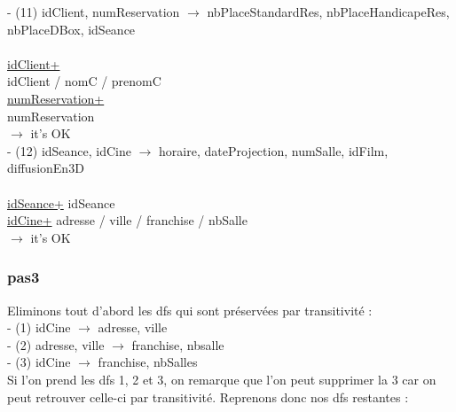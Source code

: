 \documentclass[a4paper,sffamily,12pt]{article}
\begin{document}
				\noindent - (11) idClient, numReservation $\rightarrow$ nbPlaceStandardRes, nbPlaceHandicapeRes, nbPlaceDBox, idSeance \\
					\\
					\underline{idClient+} \\
					idClient / nomC / prenomC \\
					\underline{numReservation+} \\
					numReservation \\	
				$\rightarrow$ it's OK \\					
				
				\noindent - (12) idSeance, idCine $\rightarrow$ horaire, dateProjection, numSalle, idFilm, diffusionEn3D \\												
					\\
					\underline{idSeance+}
					idSeance \\
					\underline{idCine+}
					adresse / ville / franchise / nbSalle \\
				$\rightarrow$ it's OK \\

				\vspace{0.5cm}

			\subsubsection{pas3}		
	
				\vspace{0.5cm}
	
				\noindent Eliminons tout d'abord les dfs qui sont préservées par transitivité : \\
	
					\noindent- (1) idCine $\rightarrow$ adresse, ville \\
					- (2) adresse, ville $\rightarrow$ franchise, nbsalle \\
					- (3) idCine $\rightarrow$ franchise, nbSalles \\
					
					Si l'on prend les dfs 1, 2 et 3, on remarque que l'on peut supprimer la 3 car on peut retrouver celle-ci par transitivité. Reprenons donc nos dfs restantes : \\
					
\end{document}
